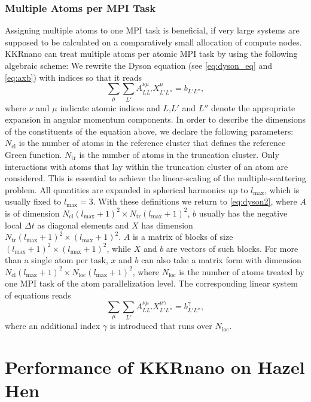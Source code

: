 \documentclass[graybox]{svmult}
\newcommand{\beq}{\begin{equation}}
\newcommand{\eeq}{\end{equation}}
\begin{document}
\subsubsection*{Multiple Atoms per MPI Task}

Assigning multiple atoms to one MPI task is beneficial, if very large systems are
supposed to be calculated on a comparatively small allocation of compute nodes.
KKRnano can treat multiple atoms per atomic MPI task by using the following algebraic scheme: 
We rewrite the Dyson equation (see \cref{eq:dyson_eq} and \cref{eq:axb}) with indices so that it reads
\beq
\sum_{\mu} \sum_{L'} A^{\nu \mu}_{LL'} X^{\mu}_{L'L''} = b_{L'L''},
\label{eq:dyson2}
\eeq
where $\nu$ and $\mu$ indicate atomic indices and $L$,$L'$ and $L''$ denote
the appropriate expansion in angular momentum components.
In order to describe the dimensions of the constituents of the equation above, we
declare the following parameters:
$N_{\text{cl}}$ is the number of atoms in the reference cluster that defines the reference Green function.
$N_{\text{tr}}$ is the number of atoms in the truncation cluster. Only interactions with atoms that lay 
within the truncation cluster of an atom are considered. This is essential to achieve
the linear-scaling of the multiple-scattering problem. 
All quantities are expanded in spherical harmonics up to $l_{\text{max}}$, which is usually fixed to
$l_{\text{max}}=3$.
With these definitions we return to \cref{eq:dyson2}, where $A$ is of dimension 
$N_{\text{cl}} (l_{\text{max}}+1)^2 \times N_{\text{tr}} (l_{\text{max}}+1)^2$,
$b$ usually has the
negative local $\Delta t$ as diagonal elements
and $X$ has dimension $N_{\text{tr}} (l_{\text{max}}+1)^2 \times (l_{\text{max}}+1)^2$.
$A$ is a matrix of blocks of size ${(l_{\text{max}}+1)}^2 \times {(l_{\text{max}}+1)}^2$,
while $X$ and $b$ are vectors
of such blocks. For more than a single atom per task, $x$ and $b$ can also take a matrix form
with dimension $N_{\text{cl}} (l_{\text{max}}+1)^2 \times N_{\text{loc}} (l_{\text{max}}+1)^2$, where
$N_{\text{loc}}$ is the number of atoms treated by one MPI task of the atom parallelization level.
The corresponding linear system of equations reads
\beq
\label{eq:dyson_equation_lap_multi}
\sum_{\mu} \sum_{L'} A^{\nu \mu}_{LL'} X^{\mu \gamma}_{L'L''} = b^{\gamma}_{L'L''},
\eeq
where an additional index $\gamma$ is introduced that runs over $N_{\text{loc}}$. 


\section{Performance of KKRnano on Hazel Hen}
\label{sec:performance}
\end{document}
